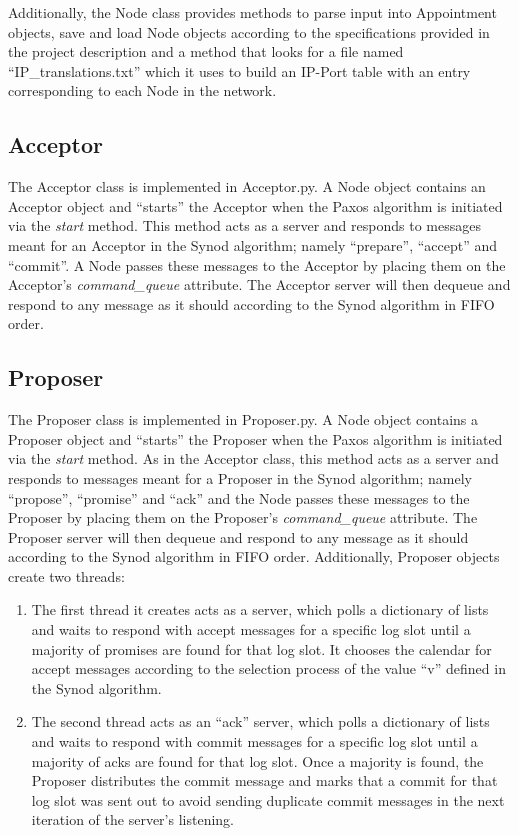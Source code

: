 \documentclass{article}
\begin{document}
		\noindent Additionally, the Node class provides methods to parse input into Appointment objects, save and load Node objects according to the specifications provided in the project description and a method that looks for a file named ``IP\_translations.txt'' which it uses to build an IP-Port table with an entry corresponding to each Node in the network.
		
	\subsection{Acceptor}
		The Acceptor class is implemented in Acceptor.py. A Node object contains an Acceptor object and ``starts'' the Acceptor when the Paxos algorithm is initiated via the \textit{start} method. This method acts as a server and responds to messages meant for an Acceptor in the Synod algorithm; namely ``prepare'', ``accept'' and ``commit''.
		A Node passes these messages to the Acceptor by placing them on the Acceptor's \textit{command\_queue} attribute.
		The Acceptor server will then dequeue and respond to any message as it should according to the Synod algorithm in FIFO order.

	\subsection{Proposer}
		The Proposer class is implemented in Proposer.py. A Node object contains a Proposer object and ``starts'' the Proposer when the Paxos algorithm is initiated via the \textit{start} method. As in the Acceptor class, this method acts as a server and responds to messages meant for a Proposer in the Synod algorithm; namely ``propose'', ``promise'' and ``ack'' and the Node passes these messages to the Proposer by placing them on the Proposer's \textit{command\_queue} attribute.
		The Proposer server will then dequeue and respond to any message as it should according to the Synod algorithm in FIFO order. Additionally, Proposer objects create two threads:
		
		\begin{enumerate}
			\item The first thread it creates acts as a server, which polls a dictionary of lists and waits to respond with accept messages for a specific log slot until a majority of promises are found for that log slot. It chooses the calendar for accept messages according to the selection process of the value ``v'' defined in the Synod algorithm.
			\item The second thread acts as an ``ack'' server, which polls a dictionary of lists and waits to respond with commit messages for a specific log slot until a majority of acks are found for that log slot. Once a majority is found, the Proposer distributes the commit message and marks that a commit for that log slot was sent out to avoid sending duplicate commit messages in the next iteration of the server's listening.
		\end{enumerate}
\end{document}
